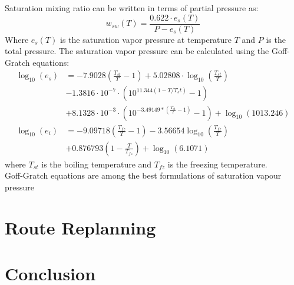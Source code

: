 \documentclass[a4paper, 12pt]{report}
\begin{document}
Saturation mixing ratio can be written in terms of partial pressure as:
\begin{equation*}
        w_{sw}(T) = \frac{0.622\cdot e_s(T)}{P - e_s(T)}
\end{equation*} 
Where $e_s(T)$ is the saturation vapor pressure at temperature $T$ and $P$ is the total pressure. The saturation vapor pressure can be calculated using the Goff-Gratch equations\cite{goff}:
\begin{align*}
        \log_{10}(e_s) &= -7.9028\left(\frac{T_{st}}{T}-1\right)+5.02808\cdot \log_{10}\left(\frac{T_{st}}{T}\right)\\
        &-1.3816\cdot 10^{-7}\cdot \left(10^{11.344\left(1-T/T_st\right)}-1\right)\\
        &+8.1328\cdot 10^{-3} \cdot \left(10^{-3.49149*\left(\frac{T_{st}}{T}-1\right)}-1\right) + \log_{10}(1013.246)\\
        \log_{10}(e_i) &=
        -9.09718\left(\frac{T_{fz}}{T}-1\right)-3.56654\log_{10}\left(\frac{T_{fz}}{T}\right)\\
        &+0.876793\left(1-\frac{T}{T_{fz}}\right) + \log_{10}(6.1071)
\end{align*}
where $T_{st}$ is the boiling temperature and $T_{fz}$ is the freezing temperature.\\

Goff-Gratch equations are among the best formulations of saturation vapour pressure \cite{goff_best}

\chapter{Route Replanning}

\chapter{Conclusion}


\printbibliography
    
\end{document}
